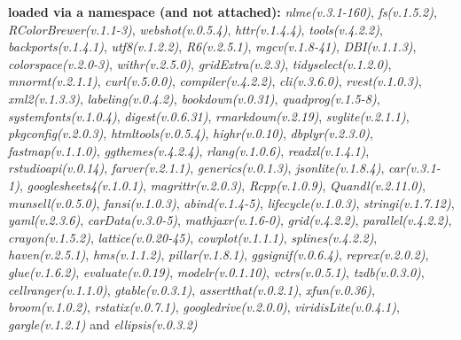 \documentclass[
  bookmarksnumbered]{article}
\begin{document}
\textbf{loaded via a namespace (and not attached):}
\emph{nlme(v.3.1-160)}, \emph{fs(v.1.5.2)}, \emph{RColorBrewer(v.1.1-3)}, \emph{webshot(v.0.5.4)}, \emph{httr(v.1.4.4)}, \emph{tools(v.4.2.2)}, \emph{backports(v.1.4.1)}, \emph{utf8(v.1.2.2)}, \emph{R6(v.2.5.1)}, \emph{mgcv(v.1.8-41)}, \emph{DBI(v.1.1.3)}, \emph{colorspace(v.2.0-3)}, \emph{withr(v.2.5.0)}, \emph{gridExtra(v.2.3)}, \emph{tidyselect(v.1.2.0)}, \emph{mnormt(v.2.1.1)}, \emph{curl(v.5.0.0)}, \emph{compiler(v.4.2.2)}, \emph{cli(v.3.6.0)}, \emph{rvest(v.1.0.3)}, \emph{xml2(v.1.3.3)}, \emph{labeling(v.0.4.2)}, \emph{bookdown(v.0.31)}, \emph{quadprog(v.1.5-8)}, \emph{systemfonts(v.1.0.4)}, \emph{digest(v.0.6.31)}, \emph{rmarkdown(v.2.19)}, \emph{svglite(v.2.1.1)}, \emph{pkgconfig(v.2.0.3)}, \emph{htmltools(v.0.5.4)}, \emph{highr(v.0.10)}, \emph{dbplyr(v.2.3.0)}, \emph{fastmap(v.1.1.0)}, \emph{ggthemes(v.4.2.4)}, \emph{rlang(v.1.0.6)}, \emph{readxl(v.1.4.1)}, \emph{rstudioapi(v.0.14)}, \emph{farver(v.2.1.1)}, \emph{generics(v.0.1.3)}, \emph{jsonlite(v.1.8.4)}, \emph{car(v.3.1-1)}, \emph{googlesheets4(v.1.0.1)}, \emph{magrittr(v.2.0.3)}, \emph{Rcpp(v.1.0.9)}, \emph{Quandl(v.2.11.0)}, \emph{munsell(v.0.5.0)}, \emph{fansi(v.1.0.3)}, \emph{abind(v.1.4-5)}, \emph{lifecycle(v.1.0.3)}, \emph{stringi(v.1.7.12)}, \emph{yaml(v.2.3.6)}, \emph{carData(v.3.0-5)}, \emph{mathjaxr(v.1.6-0)}, \emph{grid(v.4.2.2)}, \emph{parallel(v.4.2.2)}, \emph{crayon(v.1.5.2)}, \emph{lattice(v.0.20-45)}, \emph{cowplot(v.1.1.1)}, \emph{splines(v.4.2.2)}, \emph{haven(v.2.5.1)}, \emph{hms(v.1.1.2)}, \emph{pillar(v.1.8.1)}, \emph{ggsignif(v.0.6.4)}, \emph{reprex(v.2.0.2)}, \emph{glue(v.1.6.2)}, \emph{evaluate(v.0.19)}, \emph{modelr(v.0.1.10)}, \emph{vctrs(v.0.5.1)}, \emph{tzdb(v.0.3.0)}, \emph{cellranger(v.1.1.0)}, \emph{gtable(v.0.3.1)}, \emph{assertthat(v.0.2.1)}, \emph{xfun(v.0.36)}, \emph{broom(v.1.0.2)}, \emph{rstatix(v.0.7.1)}, \emph{googledrive(v.2.0.0)}, \emph{viridisLite(v.0.4.1)}, \emph{gargle(v.1.2.1)} and \emph{ellipsis(v.0.3.2)}
\end{document}
